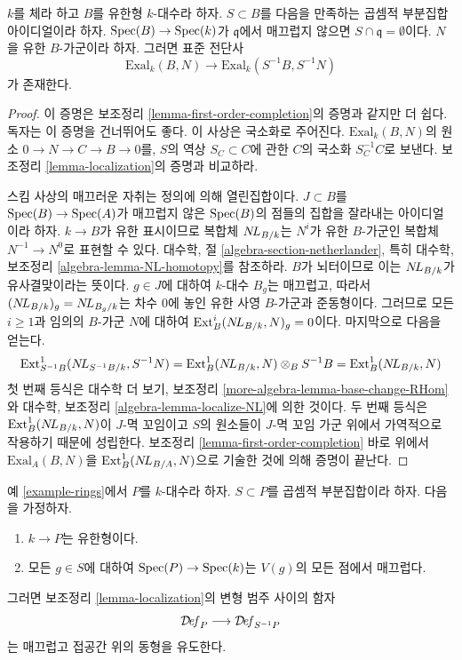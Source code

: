 \begin{lemma}
\label{lemma-first-order-localization}
$k$를 체라 하고 $B$를 유한형 $k$-대수라 하자. $S \subset B$를 다음을
만족하는 곱셈적 부분집합 아이디얼이라 하자.%
$\mathop{\mathrm{Spec}}(B) \to \mathop{\mathrm{Spec}}(k)$가 $\mathfrak q$에서 매끄럽지 않으면
$S \cap \mathfrak q = \emptyset$이다. $N$을 유한 $B$-가군이라 하자.
그러면 표준 전단사
$$
\text{Exal}_k(B, N) \to \text{Exal}_k(S^{-1}B, S^{-1}N)
$$
가 존재한다.
\end{lemma}

\begin{proof}
이 증명은 보조정리 \ref{lemma-first-order-completion}의 증명과 같지만
더 쉽다. 독자는 이 증명을 건너뛰어도 좋다. 이 사상은 국소화로 주어진다.
$\text{Exal}_k(B, N)$의 원소 $0 \to N \to C \to B \to 0$를,
$S$의 역상 $S_C \subset C$에 관한 $C$의 국소화 $S_C^{-1}C$로 보낸다.
보조정리 \ref{lemma-localization}의 증명과 비교하라.

\medskip\noindent
스킴 사상의 매끄러운 자취는 정의에 의해 열린집합이다.
$J \subset B$를 $\mathop{\mathrm{Spec}}(B) \to \mathop{\mathrm{Spec}}(A)$가 매끄럽지 않은%
$\mathop{\mathrm{Spec}}(B)$의 점들의 집합을 잘라내는 아이디얼이라 하자. $k \to B$가
유한 표시이므로 복합체 $\mathop{N\!L}\nolimits_{B/k}$는 $N^i$가 유한 $B$-가군인 복합체
$N^{-1} \to N^0$로 표현할 수 있다. 대수학, 절
\ref{algebra-section-netherlander}, 특히 대수학, 보조정리
\ref{algebra-lemma-NL-homotopy}를 참조하라. $B$가 뇌터이므로 이는
$\mathop{N\!L}\nolimits_{B/k}$가 유사결맞이라는 뜻이다. $g \in J$에 대하여 $k$-대수
$B_g$는 매끄럽고, 따라서 $(\mathop{N\!L}\nolimits_{B/k})_g = \mathop{N\!L}\nolimits_{B_g/k}$는 차수 $0$에
놓인 유한 사영 $B$-가군과 준동형이다.%
그러므로 모든 $i \geq 1$과 임의의 $B$-가군 $N$에 대하여
$\text{Ext}^i_B(\mathop{N\!L}\nolimits_{B/k}, N)_g = 0$이다. 마지막으로 다음을 얻는다.
$$
\text{Ext}^1_{S^{-1}B}(\mathop{N\!L}\nolimits_{S^{-1}B/k}, S^{-1}N) =
\text{Ext}^1_B(\mathop{N\!L}\nolimits_{B/k}, N) \otimes_B S^{-1}B =
\text{Ext}^1_B(\mathop{N\!L}\nolimits_{B/k}, N)
$$
첫 번째 등식은 대수학 더 보기, 보조정리
\ref{more-algebra-lemma-base-change-RHom}와 대수학, 보조정리
\ref{algebra-lemma-localize-NL}에 의한 것이다. 두 번째 등식은
$\text{Ext}^1_B(\mathop{N\!L}\nolimits_{B/k}, N)$이 $J$-멱 꼬임이고 $S$의 원소들이
$J$-멱 꼬임 가군 위에서 가역적으로 작용하기 때문에 성립한다.
보조정리 \ref{lemma-first-order-completion} 바로 위에서
$\text{Exal}_A(B, N)$을 $\text{Ext}^1_B(\mathop{N\!L}\nolimits_{B/A}, N)$으로 기술한 것에
의해 증명이 끝난다.
\end{proof}

\begin{lemma}
\label{lemma-smooth-localization}
예 \ref{example-rings}에서 $P$를 $k$-대수라 하자. $S \subset P$를
곱셈적 부분집합이라 하자. 다음을 가정하자.
\begin{enumerate}
\item $k \to P$는 유한형이다.
\item 모든 $g \in S$에 대하여 $\mathop{\mathrm{Spec}}(P) \to \mathop{\mathrm{Spec}}(k)$는 $V(g)$의
모든 점에서 매끄럽다.
\end{enumerate}
그러면 보조정리 \ref{lemma-localization}의 변형 범주 사이의 함자
$$
\mathcal{D}\!\mathit{ef}_P \longrightarrow \mathcal{D}\!\mathit{ef}_{S^{-1}P}
$$
는 매끄럽고 접공간 위의 동형을 유도한다.
\end{lemma}

